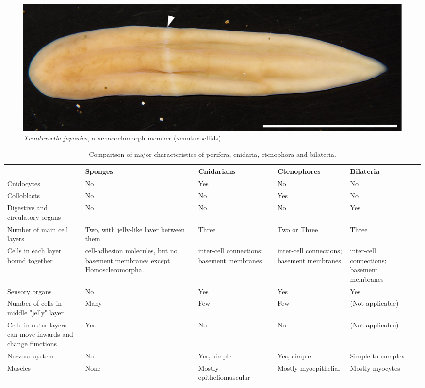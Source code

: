 \begin{figure}

{\centering \includegraphics[width=0.7\linewidth]{./figures/animals/Xenoturbella_japonica} 

}

\caption{\href{https://commons.wikimedia.org/wiki/File:Xenoturbella_japonica.jpg}{\emph{Xenoturbella japonica}, a xenacoelomorph member (xenoturbellids).}}\label{fig:xenacoelomorpha}
\end{figure}

\onecolumn

\begin{table}

\caption{\label{tab:anicomparison}Comparison of major characteristics of porifera, cnidaria, ctenophora and bilateria.}
\centering
\begin{tabular}[t]{>{\raggedright\arraybackslash}p{10em}>{\raggedright\arraybackslash}p{10em}>{\raggedright\arraybackslash}p{10em}>{\raggedright\arraybackslash}p{10em}>{\raggedright\arraybackslash}p{10em}>{\raggedright\arraybackslash}p{10em}}
\toprule
 & Sponges & Cnidarians & Ctenophores & Bilateria\\
\midrule
\rowcolor{gray!6}  Cnidocytes & No & Yes & No & No\\
Colloblasts & No & No & Yes & No\\
\rowcolor{gray!6}  Digestive and circulatory organs & No & No & No & Yes\\
Number of main cell layers & Two, with jelly-like layer between them & Three & Two or Three & Three\\
\rowcolor{gray!6}  Cells in each layer bound together & cell-adhesion molecules, but no basement membranes except Homoscleromorpha. & inter-cell connections; basement membranes & inter-cell connections; basement membranes & inter-cell connections; basement membranes\\
\addlinespace
Sensory organs & No & Yes & Yes & Yes\\
\rowcolor{gray!6}  Number of cells in middle "jelly" layer & Many & Few & Few & (Not applicable)\\
Cells in outer layers can move inwards and change functions & Yes & No & No & (Not applicable)\\
\rowcolor{gray!6}  Nervous system & No & Yes, simple & Yes, simple & Simple to complex\\
Muscles & None & Mostly epitheliomuscular & Mostly myoepithelial & Mostly myocytes\\
\bottomrule
\end{tabular}
\end{table}

